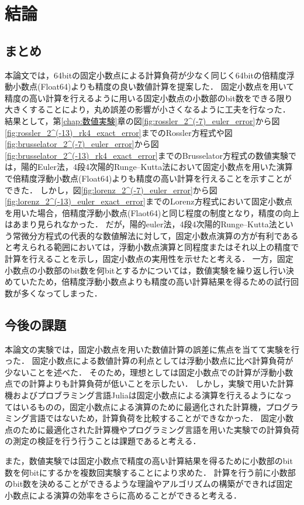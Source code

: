 \chapter{結論}
\label{chap:結論}
\section{まとめ}
本論文では，64bitの固定小数点による計算負荷が少なく同じく64bitの倍精度浮動小数点(Float64)よりも精度の良い数値計算を提案した．
固定小数点を用いて精度の高い計算を行えるように用いる固定小数点の小数部のbit数をできる限り大きくすることにより，丸め誤差の影響が小さくなるように工夫を行なった．
結果として，第\ref{chap:数値実験}章の図\ref{fig:rossler_2^(-7)_euler_error}から図\ref{fig:rossler_2^(-13)_rk4_exact_error}までのRossler方程式や図\ref{fig:brusselator_2^(-7)_euler_error}から図\ref{fig:brusselator_2^(-13)_rk4_exact_error}までのBrusselator方程式の数値実験では，陽的Euler法，4段4次陽的Runge--Kutta法において固定小数点を用いた演算で倍精度浮動小数点(Float64)よりも精度の高い計算を行えることを示すことができた．
しかし，図\ref{fig:lorenz_2^(-7)_euler_error}から図\ref{fig:lorenz_2^(-13)_euler_exact_error}までのLorenz方程式において固定小数点を用いた場合，倍精度浮動小数点(Flaot64)と同じ程度の制度となり，精度の向上はあまり見られなかった．
だが，陽的euler法，4段4次陽的Runge--Kutta法という常微分方程式の代表的な数値解法に対して，固定小数点演算の方が有利であると考えられる範囲においては，浮動小数点演算と同程度またはそれ以上の精度で計算を行えることを示し，固定小数点の実用性を示せたと考える．
一方，固定小数点の小数部のbit数を何bitとするかについては，数値実験を繰り返し行い決めていたため，倍精度浮動小数点よりも精度の高い計算結果を得るための試行回数が多くなってしまった．

\section{今後の課題}
本論文の実験では，固定小数点を用いた数値計算の誤差に焦点を当てて実験を行った．
固定小数点による数値計算の利点としては浮動小数点に比べ計算負荷が少ないことを述べた．
そのため，理想としては固定小数点での計算が浮動小数点での計算よりも計算負荷が低いことを示したい．
しかし，実験で用いた計算機およびプロブラミング言語Juliaは固定小数点による演算を行えるようになってはいるものの，固定小数点による演算のために最適化された計算機，プログラミング言語ではないため，計算負荷を比較することができなかった．
固定小数点のために最適化された計算機やプログラミング言語を用いた実験での計算負荷の測定の検証を行う行うことは課題であると考える．


また，数値実験では固定小数点で精度の高い計算結果を得るために小数部のbit数を何bitにするかを複数回実験することにより求めた．
計算を行う前に小数部のbit数を決めることができるような理論やアルゴリズムの構築ができれば固定小数点による演算の効率をさらに高めることができると考える．